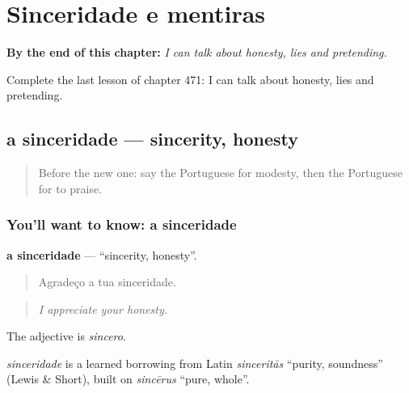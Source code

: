 
\chapter{Sinceridade e mentiras}
\label{ch:pt-sinceridade-e-mentiras}

\begin{chapteropening}
\textbf{By the end of this chapter:} \emph{I can talk about honesty, lies and pretending.}

Complete the last lesson of chapter 471: I can talk about honesty, lies and pretending.
\end{chapteropening}

\section[a sinceridade]{a sinceridade — sincerity, honesty}

\label{lesson:PT-C471-sinceridade}



\begin{quote}
Before the new one: say the Portuguese for modesty, then the Portuguese for to praise.
\end{quote}

\subsection*{You'll want to know: a sinceridade}
\textbf{a sinceridade} — \textquotedblleft{}sincerity, honesty\textquotedblright{}.

\begin{quote}
Agradeço a tua sinceridade.
\end{quote}

\begin{quote}
\emph{I appreciate your honesty.}
\end{quote}

The adjective is \emph{sincero}.

\begin{cousinweb}
\emph{sinceridade} is a learned borrowing from Latin \emph{sinceritās} \textquotedblleft{}purity, soundness\textquotedblright{} (Lewis \& Short), built on \emph{sincērus} \textquotedblleft{}pure, whole\textquotedblright{}.
\end{cousinweb}

